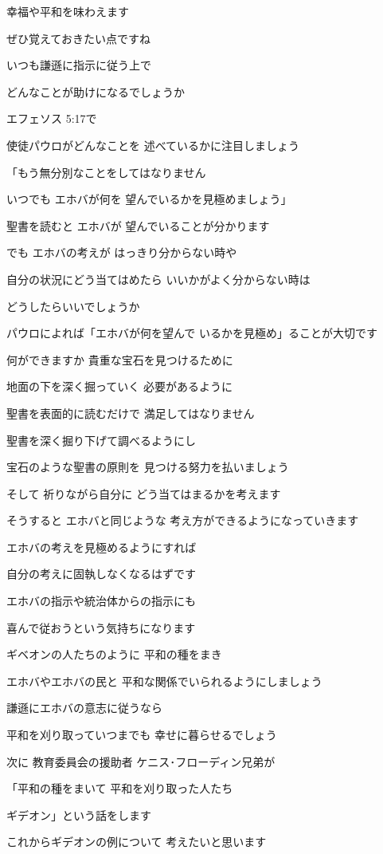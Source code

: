 \documentclass[twocolumn]{jsarticle}
\begin{document}
幸福や平和を味わえます

ぜひ覚えておきたい点ですね

いつも謙遜に指示に従う上で

どんなことが助けになるでしょうか

エフェソス 5:17で

使徒パウロがどんなことを
述べているかに注目しましょう

「もう無分別なことをしてはなりません

いつでも エホバが何を
望んでいるかを見極めましょう」

聖書を読むと エホバが
望んでいることが分かります

でも エホバの考えが
はっきり分からない時や

自分の状況にどう当てはめたら
いいかがよく分からない時は

どうしたらいいでしょうか

パウロによれば「エホバが何を望んで
いるかを見極め」ることが大切です

何ができますか
貴重な宝石を見つけるために

地面の下を深く掘っていく
必要があるように

聖書を表面的に読むだけで
満足してはなりません

聖書を深く掘り下げて調べるようにし

宝石のような聖書の原則を
見つける努力を払いましょう

そして 祈りながら自分に
どう当てはまるかを考えます

そうすると エホバと同じような
考え方ができるようになっていきます

エホバの考えを見極めるようにすれば

自分の考えに固執しなくなるはずです

エホバの指示や統治体からの指示にも

喜んで従おうという気持ちになります

ギベオンの人たちのように
平和の種をまき

エホバやエホバの民と
平和な関係でいられるようにしましょう

謙遜にエホバの意志に従うなら

平和を刈り取っていつまでも
幸せに暮らせるでしょう

次に 教育委員会の援助者
ケニス･フローディン兄弟が

「平和の種をまいて
平和を刈り取った人たち

ギデオン」という話をします

これからギデオンの例について
考えたいと思います
\end{document}
